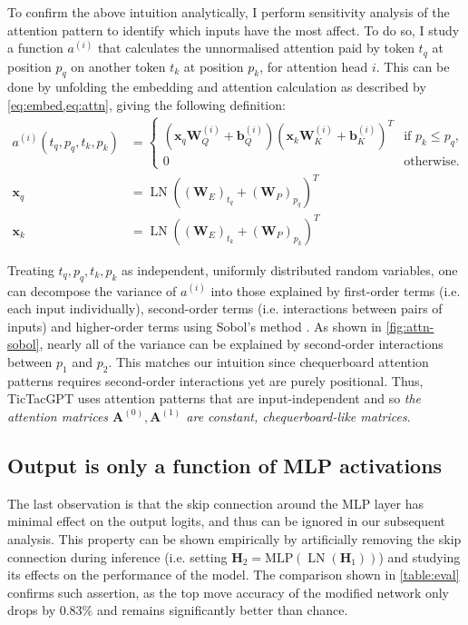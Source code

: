 \documentclass{article}
\newcommand{\ttgpt}{TicTacGPT\xspace}
\renewcommand{\v}[1]{\mathbf{\bm{#1}}}
\newcommand{\m}[1]{\mathbf{\bm{#1}}}
\DeclareMathOperator{\layernorm}{LN}
\begin{document}
To confirm the above intuition analytically, I perform sensitivity analysis of the attention pattern to identify which inputs have the most affect. To do so, I study a function $a^{(i)}$ that calculates the unnormalised attention paid by token $t_q$ at position $p_q$ on another token $t_k$ at position $p_k$, for attention head $i$. This can be done by unfolding the embedding and attention calculation as described by \cref{eq:embed,eq:attn}, giving the following definition:
\begin{equation*}
    \begin{aligned}
        a^{(i)}(t_q, p_q, t_k, p_k)
         & =\begin{cases}
                \left(\v{x}_q \m{W}_Q^{(i)} + \v{b}_Q^{(i)}\right)
                \left(\v{x}_k \m{W}_K^{(i)} + \v{b}_K^{(i)}\right)^T
                  & \text{if }p_k \leq p_q, \\
                0 & \text{otherwise.}
            \end{cases} \\
        \v{x}_q
         & = \layernorm((\m{W}_E)_{t_q} + (\m{W}_P)_{p_q})^T    \\
        \v{x}_k
         & = \layernorm((\m{W}_E)_{t_k} + (\m{W}_P)_{p_k})^T
    \end{aligned}
\end{equation*}

Treating $t_q, p_q, t_k, p_k$ as independent, uniformly distributed random variables, one can decompose the variance of $a^{(i)}$ into those explained by first-order terms (i.e. each input individually), second-order terms (i.e. interactions between pairs of inputs) and higher-order terms using Sobol's method \citep{sobol1993sensitivity,sobol2001global}. As shown in \cref{fig:attn-sobol}, nearly all of the variance can be explained by second-order interactions between $p_1$ and $p_2$. This matches our intuition since chequerboard attention patterns requires second-order interactions yet are purely positional. Thus, \ttgpt uses attention patterns that are input-independent and so \emph{the attention matrices $\m{A}^{(0)}, \m{A}^{(1)}$ are constant, chequerboard-like matrices}.

\subsection{Output is only a function of MLP activations} \label{sec:simplify-output}

The last observation is that the skip connection around the MLP layer has minimal effect on the output logits, and thus can be ignored in our subsequent analysis. This property can be shown empirically by artificially removing the skip connection during inference (i.e. setting $\m{H}_2 = \text{MLP}(\layernorm(\m{H}_1))$) and studying its effects on the performance of the model. The comparison shown in \cref{table:eval} confirms such assertion, as the top move accuracy of the modified network only drops by $0.83\%$ and remains significantly better than chance.
\end{document}
